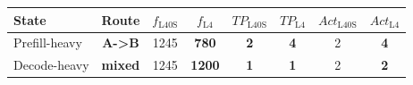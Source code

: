 \begin{tabular}{lccccccc}
\toprule
State & Route & $f_{\mathrm{L40S}}$ & $f_{\mathrm{L4}}$ & $TP_{\mathrm{L40S}}$ & $TP_{\mathrm{L4}}$ & $Act_{\mathrm{L40S}}$ & $Act_{\mathrm{L4}}$ \\
\midrule
Prefill-heavy & \textbf{A->B} & 1245 & \textbf{780} & \textbf{2} & \textbf{4} & 2 & \textbf{4} \\
Decode-heavy & \textbf{mixed} & 1245 & \textbf{1200} & \textbf{1} & \textbf{1} & 2 & \textbf{2} \\
\bottomrule
\end{tabular}